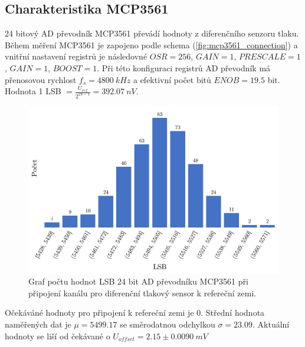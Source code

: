 \subsection{Charakteristika MCP3561}
24 bitový AD převodník MCP3561 převádí hodnoty z diferenčního senzoru tlaku. Během měření MCP3561 je zapojeno podle schema (\ref{fig:mcp3561_connection}) a vnitřní nastavení registrů je následovné $OSR = 256$, $GAIN = 1$, $PRESCALE = 1$, $GAIN = 1$, $BOOST = 1$.
Při této konfiguraci registrů AD převodník má přenosovou rychlost $f_s = 4800 \ kHz$ a efektivní počet bitů $ENOB = 19.5$ bit. Hodnota 1 LSB $= \frac{U_{ref}}{2^{24 - 1}} = 392.07 \ nV$.
\begin{figure}[H]
    \caption{Graf počtu hodnot LSB 24 bit AD převodníku MCP3561 při připojení kanálu
        pro diferenční tlakový sensor k refereční zemi.}
    \includegraphics[width=1\textwidth]{graphs/mcp_gnd.png}
\end{figure}
Očekáváné hodnoty pro připojení k refereční zemi je 0. Střední hodnota naměřených dat je $\mu = 5499.17$ se směrodatnou odchylkou $\sigma = 23.09$. Aktuální hodnoty se liší od čekávané o $U_{offset} = 2.15 \pm 0.0090 \ mV$

